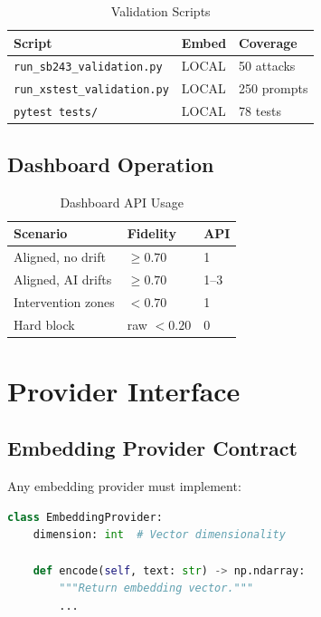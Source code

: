 \documentclass[11pt,twocolumn]{article}
\begin{document}
\begin{table}[!htbp]
\centering
\small
\caption{Validation Scripts}
\begin{tabular}{@{}lll@{}}
\toprule
\textbf{Script} & \textbf{Embed} & \textbf{Coverage} \\
\midrule
\texttt{run\_sb243\_validation.py} & LOCAL & 50 attacks \\
\texttt{run\_xstest\_validation.py} & LOCAL & 250 prompts \\
\texttt{pytest tests/} & LOCAL & 78 tests \\
\bottomrule
\end{tabular}
\end{table}

\subsection{Dashboard Operation}

\begin{table}[!htbp]
\centering
\small
\caption{Dashboard API Usage}
\begin{tabular}{@{}lll@{}}
\toprule
\textbf{Scenario} & \textbf{Fidelity} & \textbf{API} \\
\midrule
Aligned, no drift & $\geq 0.70$ & 1 \\
Aligned, AI drifts & $\geq 0.70$ & 1--3 \\
Intervention zones & $< 0.70$ & 1 \\
Hard block & raw $< 0.20$ & 0 \\
\bottomrule
\end{tabular}
\end{table}

\section{Provider Interface}

\subsection{Embedding Provider Contract}

Any embedding provider must implement:

\begin{lstlisting}[language=Python]
class EmbeddingProvider:
    dimension: int  # Vector dimensionality

    def encode(self, text: str) -> np.ndarray:
        """Return embedding vector."""
        ...
\end{lstlisting}
\end{document}
